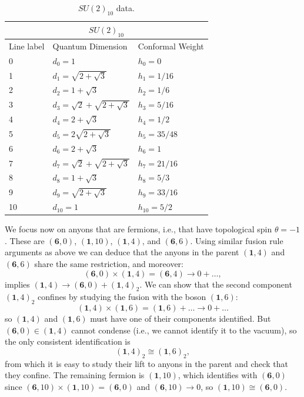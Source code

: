 \documentclass[11pt]{article}
\numberwithin{equation}{section}
\begin{document}
\begin{table}[!b]
\centering
\begin{tabular}[h]{|p{4cm}|p{4cm}|p{4cm}| }
\hline 
\multicolumn{3}{|c|}{$SU(2)_{10}$} \\
\hline
Line label & Quantum Dimension & Conformal Weight \\
\hline
0 & $d_{0} = 1$ & $h_{0}=0$ \\
1 & $d_{1} = \sqrt{2+\sqrt{3}}$ & $h_{1}=1/16$ \\
2 & $d_{2} = 1 + \sqrt{3}$ & $h_{2}=1/6$ \\
3 & $d_{3} = \sqrt{2} + \sqrt{2+\sqrt{3}}$ & $h_{3}=5/16$ \\
4 & $d_{4} = 2+\sqrt{3}$ & $h_{4}=1/2$ \\
5 & $d_{5} = 2\sqrt{2+\sqrt{3}}$ & $h_{5}=35/48$ \\
6 & $d_{6} = 2+\sqrt{3}$ & $h_{6}=1$ \\
7 & $d_{7} = \sqrt{2} + \sqrt{2+\sqrt{3}}$ & $h_{7}=21/16$ \\
8 & $d_{8} = 1 + \sqrt{3}$ & $h_{8}=5/3$ \\
9 & $d_{9} = \sqrt{2+\sqrt{3}}$ & $h_{9}=33/16$ \\
10 & $d_{10} = 1$ & $h_{10}=5/2$ \\
\hline
\end{tabular}
\caption{$SU(2)_{10}$ data.}  \label{su2lv10table}
\end{table}

We focus now on anyons that are fermions, i.e., that have topological spin $\theta = -1$. These are $(\mathbf{6},0)$, $(\mathbf{1},10)$, $(\mathbf{1},4)$, and $(\mathbf{6},6)$. Using similar fusion rule arguments as above we can deduce that the anyons in the parent $(\mathbf{1},4)$ and $(\mathbf{6},6)$ share the same restriction, and moreover:
\begin{equation}
    (\mathbf{6},0) \times (\mathbf{1},4) = (\mathbf{6},4) \longrightarrow 0 + \ldots,
\end{equation}
implies $(\mathbf{1},4) \to (\mathbf{6},0) + (\mathbf{1},4)_{2}$. We can show that the second component $(\mathbf{1},4)_{2}$ confines by studying the fusion with the boson $(\mathbf{1},6)$:
\begin{equation}
    (\mathbf{1},4) \times (\mathbf{1},6) = (\mathbf{1},6) + \ldots \longrightarrow 0 + \ldots
\end{equation}
so $(\mathbf{1},4)$ and $(\mathbf{1},6)$ must have one of their components identified. But $(\mathbf{6},0) \in (\mathbf{1},4)$ cannot condense (i.e., we cannot identify it to the vacuum), so the only consistent identification is
\begin{equation}
    (\mathbf{1},4)_{2} \cong (\mathbf{1},6)_{2},
\end{equation}
from which it is easy to study their lift to anyons in the parent and check that they confine. The remaining fermion is $(\mathbf{1},10)$, which identifies with $ (\mathbf{6},0)$ since $(\mathbf{6},10) \times (\mathbf{1},10) = (\mathbf{6},0)$ and $(\mathbf{6},10) \to 0$, so $(\mathbf{1},10) \cong (\mathbf{6},0)$. 
\end{document}

